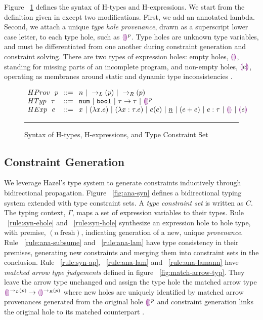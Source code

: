 \label{sec:typinf}
Figure ~\ref{fig:syntax_fig} defines the syntax of H-types and H-expressions. We start from the definition given in \citet{HazelnutPOPL} except two modifications. First, we add an annotated lambda. Second, we attach a unique \emph{type hole provenance}, drawn as a superscript lower case letter, to each type hole, such as $\textcolor{violet}{\llparenthesis}\textcolor{violet}{\rrparenthesis}^p$. Type holes are unknown type variables, and must be differentiated from one another during constraint generation and constraint solving. There are two types of expression holes: empty holes, $\textcolor{violet}{\llparenthesis}\textcolor{violet}{\rrparenthesis}$, standing for missing parts of an incomplete program, and non-empty holes, $\textcolor{violet}{\llparenthesis} e \textcolor{violet}{\rrparenthesis}$, operating as membranes around static and dynamic type inconsistencies \cite{HazelLive}. \par
\begin{figure}[h!]
\vspace{-3px} 
$\arraycolsep=4pt\begin{array}{lll}
HProv~~ p & ::= & 
    n ~\vert~ 
    \rightarrow_{L}(p) ~\vert~ 
    \rightarrow_{R}(p)
    \\
HTyp~~ \tau & ::= &
  \tnum ~\vert~
  \tbool ~\vert~
  \tarr{\tau}{\tau} ~\vert~
  \ehole^p
  \\
HExp~~ e & ::= &
  x ~\vert~
  \lamfunc{x}{e} ~\vert~
  \lamfunc{x:\tau}{e} ~\vert~
  e(e) ~\vert~
  \underlinenum{n} ~\vert~
  (e+e) ~\vert~
  e: \tau ~\vert~
  \ehole  ~\vert~
  \notehole{e} 
\end{array}$
\hrule
\caption{Syntax of H-types, H-expressions, and Type Constraint Set}
\label{fig:syntax_fig}
\vspace{-5px}
\end{figure}

\subsection{Constraint Generation}
We leverage Hazel's type system to generate constraints inductively through bidirectional propagation. Figure ~\ref{fig:ana-syn} defines a bidirectional typing system extended with type constraint sets. A \emph{type constraint set} is written as $C$. The typing context, $\Gamma$, maps a set of expression variables to their types. Rule ~\ref{rule:syn-ehole} and ~\ref{rule:syn-hole} synthesize an expression hole to hole type, with premise, $(n ~ \text{fresh})$, indicating generation of a new, unique \emph{provenance}. Rule ~\ref{rule:ana-subsume} and ~\ref{rule:ana-lam} have type consistency in their premises, generating new constraints and merging them into constraint sets in the conclusion. Rule ~\ref{rule:syn-ap}, ~\ref{rule:ana-lam} and ~\ref{rule:ana-lamann} have \emph{matched arrow type judgements} defined in figure ~\ref{fig:match-arrow-typ}. They leave the arrow type unchanged and assign the type hole the matched arrow type $\textcolor{violet}{\llparenthesis}\textcolor{violet}{\rrparenthesis}^{\rightarrow_{L}(p)} \rightarrow \textcolor{violet}{\llparenthesis}\textcolor{violet}{\rrparenthesis}^{\rightarrow_{R}(p)}$ where new holes are uniquely identified by matched arrow provenances generated from the original hole $\textcolor{violet}{\llparenthesis}\textcolor{violet}{\rrparenthesis}^{p}$ and constraint generation links the original hole to its matched counterpart \cite{HazelnutPOPL}.

